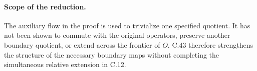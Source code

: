 \paragraph{Scope of the reduction.}
The auxiliary flow in the proof is used
to trivialize one specified quotient.
It has not been shown to commute with
the original operators, preserve another
boundary quotient, or extend across the
frontier of $O$. C.43 therefore strengthens
the structure of the necessary boundary
maps without completing the simultaneous
relative extension in C.12.
